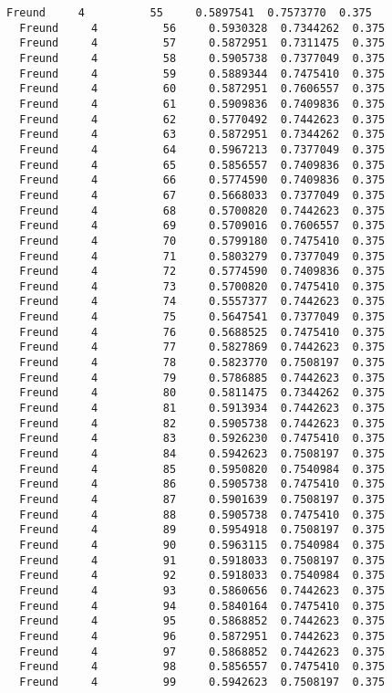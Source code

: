 \documentclass[11pt]{article}
\begin{document}
\begin{Verbatim}[commandchars=\\\{\}]
  Freund     4          55     0.5897541  0.7573770  0.375
  Freund     4          56     0.5930328  0.7344262  0.375
  Freund     4          57     0.5872951  0.7311475  0.375
  Freund     4          58     0.5905738  0.7377049  0.375
  Freund     4          59     0.5889344  0.7475410  0.375
  Freund     4          60     0.5872951  0.7606557  0.375
  Freund     4          61     0.5909836  0.7409836  0.375
  Freund     4          62     0.5770492  0.7442623  0.375
  Freund     4          63     0.5872951  0.7344262  0.375
  Freund     4          64     0.5967213  0.7377049  0.375
  Freund     4          65     0.5856557  0.7409836  0.375
  Freund     4          66     0.5774590  0.7409836  0.375
  Freund     4          67     0.5668033  0.7377049  0.375
  Freund     4          68     0.5700820  0.7442623  0.375
  Freund     4          69     0.5709016  0.7606557  0.375
  Freund     4          70     0.5799180  0.7475410  0.375
  Freund     4          71     0.5803279  0.7377049  0.375
  Freund     4          72     0.5774590  0.7409836  0.375
  Freund     4          73     0.5700820  0.7475410  0.375
  Freund     4          74     0.5557377  0.7442623  0.375
  Freund     4          75     0.5647541  0.7377049  0.375
  Freund     4          76     0.5688525  0.7475410  0.375
  Freund     4          77     0.5827869  0.7442623  0.375
  Freund     4          78     0.5823770  0.7508197  0.375
  Freund     4          79     0.5786885  0.7442623  0.375
  Freund     4          80     0.5811475  0.7344262  0.375
  Freund     4          81     0.5913934  0.7442623  0.375
  Freund     4          82     0.5905738  0.7442623  0.375
  Freund     4          83     0.5926230  0.7475410  0.375
  Freund     4          84     0.5942623  0.7508197  0.375
  Freund     4          85     0.5950820  0.7540984  0.375
  Freund     4          86     0.5905738  0.7475410  0.375
  Freund     4          87     0.5901639  0.7508197  0.375
  Freund     4          88     0.5905738  0.7475410  0.375
  Freund     4          89     0.5954918  0.7508197  0.375
  Freund     4          90     0.5963115  0.7540984  0.375
  Freund     4          91     0.5918033  0.7508197  0.375
  Freund     4          92     0.5918033  0.7540984  0.375
  Freund     4          93     0.5860656  0.7442623  0.375
  Freund     4          94     0.5840164  0.7475410  0.375
  Freund     4          95     0.5868852  0.7442623  0.375
  Freund     4          96     0.5872951  0.7442623  0.375
  Freund     4          97     0.5868852  0.7442623  0.375
  Freund     4          98     0.5856557  0.7475410  0.375
  Freund     4          99     0.5942623  0.7508197  0.375

\end{Verbatim}
\end{document}
